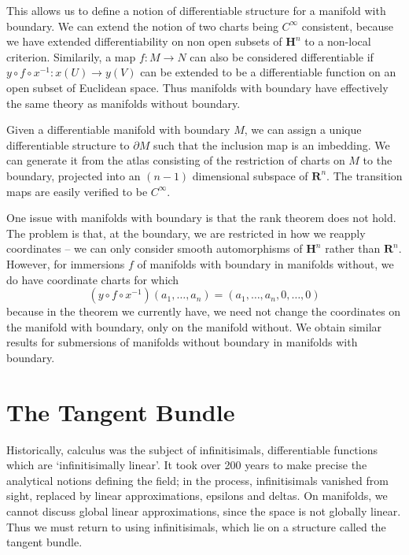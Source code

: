 This allows us to define a notion of differentiable structure for a manifold with boundary. We can extend the notion of two charts being $C^\infty$ consistent, because we have extended differentiability on non open subsets of $\mathbf{H}^n$ to a non-local criterion. Similarily, a map $f: M \to N$ can also be considered differentiable if $y \circ f \circ x^{-1}:x(U) \to y(V)$ can be extended to be a differentiable function on an open subset of Euclidean space. Thus manifolds with boundary have effectively the same theory as manifolds without boundary.

\begin{example}
    Given a differentiable manifold with boundary $M$, we can assign a unique differentiable structure to $\partial M$ such that the inclusion map is an imbedding. We can generate it from the atlas consisting of the restriction of charts on $M$ to the boundary, projected into an $(n-1)$ dimensional subspace of $\mathbf{R}^n$. The transition maps are easily verified to be $C^\infty$.
\end{example}

One issue with manifolds with boundary is that the rank theorem does not hold. The problem is that, at the boundary, we are restricted in how we reapply coordinates -- we can only consider smooth automorphisms of $\mathbf{H}^n$ rather than $\mathbf{R}^n$. However, for immersions $f$ of manifolds with boundary in manifolds without, we do have coordinate charts for which
%
\[ (y \circ f \circ x^{-1})(a_1, \dots, a_n) = (a_1, \dots, a_n, 0, \dots, 0) \]
%
because in the theorem we currently have, we need not change the coordinates on the manifold with boundary, only on the manifold without. We obtain similar results for submersions of manifolds without boundary in manifolds with boundary.




\chapter{The Tangent Bundle}

Historically, calculus was the subject of infinitisimals, differentiable functions which are `infinitisimally linear'. It took over 200 years to make precise the analytical notions defining the field; in the process, infinitisimals vanished from sight, replaced by linear approximations, epsilons and deltas. On manifolds, we cannot discuss global linear approximations, since the space is not globally linear. Thus we must return to using infinitisimals, which lie on a structure called the tangent bundle.

